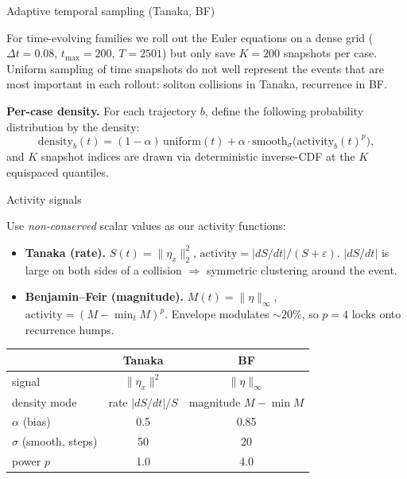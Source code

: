 \documentclass[aspectratio=169,11pt]{beamer}
\begin{document}
\begin{frame}{Adaptive temporal sampling (Tanaka, BF)}

For time-evolving families we roll out the Euler equations on a dense grid
($\Delta t = 0.08$, $t_{\max} = 200$, $T = 2501$) but only save $K = 200$
snapshots per case. Uniform sampling of time snapshots do not well represent the
events that
are most important in each rollout: soliton collisions in Tanaka, recurrence in BF.

\pause
\textbf{Per-case density.} For each trajectory $b$, define the following probability distribution by the density:
\[
  \mathrm{density}_b(t) = (1-\alpha)\,\mathrm{uniform}(t) + \alpha \cdot
  \mathrm{smooth}_\sigma\!\bigl(\mathrm{activity}_b(t)^p\bigr),
\]
and $K$ snapshot indices are drawn via deterministic inverse-CDF at the
$K$ equispaced quantiles.
\end{frame}

\begin{frame}{Activity signals}

\small
Use
\emph{non-conserved} scalar values as our activity functions:
\begin{itemize}\setlength{\itemsep}{0.2em}
  \item \textbf{Tanaka (rate).}
  $S(t) = \|\eta_x\|_2^2$, $\mathrm{activity} = |dS/dt|/(S+\varepsilon)$.
  $|dS/dt|$ is large on both sides of a collision $\Rightarrow$ symmetric
  clustering around the event.

  \item \textbf{Benjamin--Feir (magnitude).}
  $M(t) = \|\eta\|_\infty$, $\mathrm{activity} = (M - \min_t M)^p$.
  Envelope modulates $\sim 20\%$, so $p = 4$ locks onto recurrence humps.
\end{itemize}

\scriptsize
\renewcommand{\arraystretch}{0.9}
\begin{tabular}{lcc}
\toprule
                  & Tanaka                      & BF                          \\
\midrule
signal            & $\|\eta_x\|^2$              & $\|\eta\|_\infty$           \\
density mode      & rate $|dS/dt|/S$            & magnitude $M-\min M$        \\
$\alpha$ (bias)   & 0.5                         & 0.85                        \\
$\sigma$ (smooth, steps) & 50                  & 20                          \\
power $p$         & 1.0                         & 4.0                         \\
\bottomrule
\end{tabular}
\end{frame}
\end{document}
